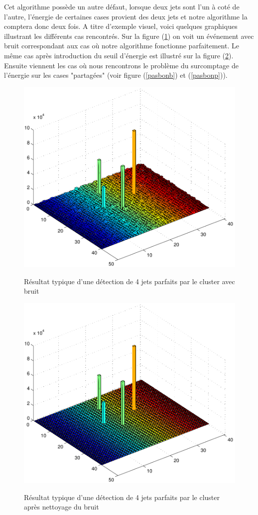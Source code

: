 \documentclass[11pt]{article}
\begin{document}
Cet algorithme possède un autre défaut, lorsque deux jets sont l'un à coté de
l'autre, l'énergie de certaines cases provient des deux jets et notre
algorithme la comptera donc deux fois. A titre d'exemple visuel, voici quelques
graphiques illustrant les différents cas rencontrés. Sur la figure (\ref{bonb})
on voit un événement avec bruit correspondant aux cas où notre algorithme
fonctionne parfaitement. Le même cas après introduction du seuil d'énergie est
illustré sur la figure (\ref{bonp}). Ensuite viennent les cas où nous
rencontrons le problème du surcomptage de l'énergie sur les cases "partagées"
(voir figure (\ref{pasbonb}) et (\ref{pasbonp})).
\begin{figure}
\caption{Résultat typique d'une détection de 4 jets parfaits par le cluster avec
bruit}
\includegraphics[scale=0.55]{images/bonCasBrut-eps-converted-to.pdf}
\label{bonb}
\end{figure}
\begin{figure}
\caption{Résultat typique d'une détection de 4 jets parfaits par le cluster
après nettoyage du bruit}
\includegraphics[scale=0.55]{images/bonCasNet-eps-converted-to.pdf}
\label{bonp}
\end{figure}
\end{document}
